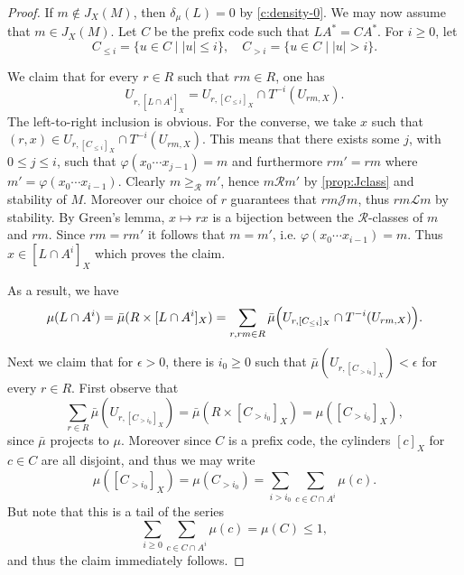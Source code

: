 \documentclass[a4paper,UKenglish,numberwithinsect,cleveref]{lipics-v2021}
\newcommand{\JJ}{\mathrel{\mathscr{J}}}
\newcommand{\RR}{\mathrel{\mathscr{R}}}
\newcommand{\LL}{\mathrel{\mathscr{L}}}
\begin{document}
\begin{proof}
    If $m\notin J_X(M)$, then $\delta_\mu(L)=0$ by \cref{c:density-0}. We may now assume that $m\in J_X(M)$. Let $C$ be the prefix code such that $LA^*=CA^*$. For $i\ge 0$, let 
    \begin{equation*}
        C_{\le i}=\{u\in C\mid |u|\le i\},\quad C_{>i}=\{u\in C\mid |u|>i\}.
    \end{equation*}
    
    We claim that for every $r\in R$ such that $rm\in R$, one has
    \[
        U_{r,[L\cap A^i]_X}=U_{r,[C_{\le i}]_X}\cap T^{-i}(U_{rm,X}).
    \]
    The left-to-right inclusion is obvious. For the converse, we take $x$ such that
    $(r,x)\in U_{r,[C_{\leq i}]_X}\cap T^{-i}(U_{rm,X})$. This means that there exists
    some  $j$, with $0\leq j\leq i$, such that $\varphi(x_0\cdots x_{j-1}) = m$ and furthermore $rm'
    = rm$ where $m' = \varphi(x_0\cdots x_{i-1})$. Clearly $m \geq_{\RR} m'$, hence $m\RR
    m'$ by \cref{prop:Jclass} and stability of $M$. Moreover our choice of $r$
    guarantees that $rm\JJ m$, thus $rm\LL m$ by stability. By Green's lemma, $x\mapsto
    rx$ is a bijection between the $\RR$-classes of $m$ and $rm$. Since $rm=rm'$ it
    follows that $m=m'$, i.e. $\varphi(x_0\cdots x_{i-1})=m$. Thus $x\in[L\cap A^i]_X$ which proves the claim.

    As a result, we have
    \[
        \mu(L\cap A^i)=\bar\mu(R\times[L\cap A^i]_X)=\sum_{r,rm\in R}\bar\mu\Bigl(U_{r,[C_{\le i}]_X}\cap T^{-i}(U_{rm,X})\Bigr).
    \]
    Next we claim that for $\epsilon >0$, there is $i_0\ge 0$ such that $\bar\mu(U_{r,[C_{>i_0}]_X})<\epsilon$ for every $r\in R$. First observe that
    \begin{equation*}
        \sum_{r\in R}\bar\mu(U_{r,[C_{>i_0}]_X}) = \bar\mu(R\times [C_{>i_0}]_X) = \mu([C_{>i_0}]_X),
    \end{equation*}
    since $\bar\mu$ projects to $\mu$. Moreover since $C$ is a prefix code, the cylinders $[c]_X$ for $c\in C$ are all disjoint, and thus we may write
    \begin{equation*}
        \mu([C_{>i_0}]_X) = \mu(C_{>i_0}) = \sum_{i>i_0}\sum_{c\in C\cap A^{i}}\mu(c).
    \end{equation*}
    But note that this is a tail of the series
    \begin{equation*}
        \sum_{i\geq 0}\sum_{c\in C\cap A^{i}}\mu(c) = \mu(C) \leq 1,
    \end{equation*}
    and thus the claim immediately follows.


\end{proof}
\end{document}
